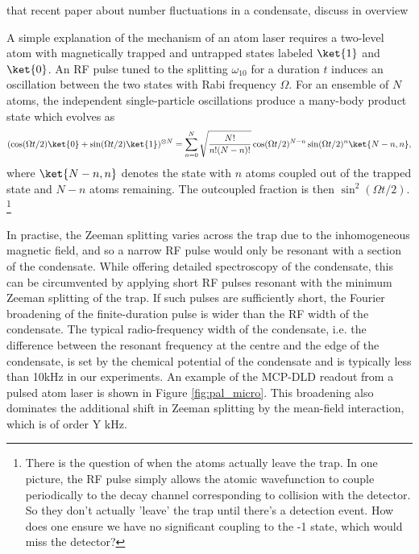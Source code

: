 	that recent paper about number fluctuations in a condensate, discuss in overview


	A simple explanation of the mechanism of an atom laser requires a two-level atom with magnetically trapped and untrapped states labeled $\ket{1}$ and $\ket{0}$.
	An RF pulse tuned to the splitting $\omega_{10}$ for a duration $t$  induces an oscillation between the two states with Rabi frequency $\Omega$.
	For an ensemble of $N$ atoms, the independent single-particle oscillations produce a many-body product state which evolves as \cite{Mewes97}
	\begin{equation}
		(\cos(\Omega t/2)\ket{0} + \sin(\Omega t/2)\ket{1})^{\otimes N} = \sum_{n=0}^{ N}\sqrt{\frac{N!}{n!(N-n)!}}\cos(\Omega t/2)^{N-n}\sin(\Omega t/2)^n\ket{N-n,n},
	\end{equation}
	where $\ket{N-n,n}$ denotes the state with $n$ atoms coupled out of the trapped state and $N-n$ atoms remaining.
	The outcoupled fraction is then $\sin^2(\Omega t/2)$.
	\footnote{There is the question of when the atoms actually leave the trap.
	In one picture, the RF pulse simply allows the atomic wavefunction to couple periodically to the decay channel corresponding to collision with the detector.
	So they don't actually 'leave' the trap until there's a detection event.
	How does one ensure we have no significant coupling to the -1 state, which would miss the detector?}

	In practise, the Zeeman splitting varies across the trap due to the inhomogeneous magnetic field, and so a narrow RF pulse would only be resonant with a section of the condensate.
	While offering detailed spectroscopy of the condensate, this can be circumvented by applying short RF pulses resonant with the minimum Zeeman splitting of the trap.
	If such pulses are sufficiently short, the Fourier broadening of the finite-duration pulse is wider than the RF width of the condensate.
	The typical radio-frequency width of the condensate, i.e.
	the difference between the resonant frequency at the centre and the edge of the condensate, is set by the chemical potential of the condensate and is typically less than 10kHz in our experiments.
	An example of the MCP-DLD readout from a pulsed atom laser is shown in Figure \ref{fig:pal_micro}.
	This broadening also dominates the additional shift in Zeeman splitting by the mean-field interaction, which is of order Y kHz.
	
